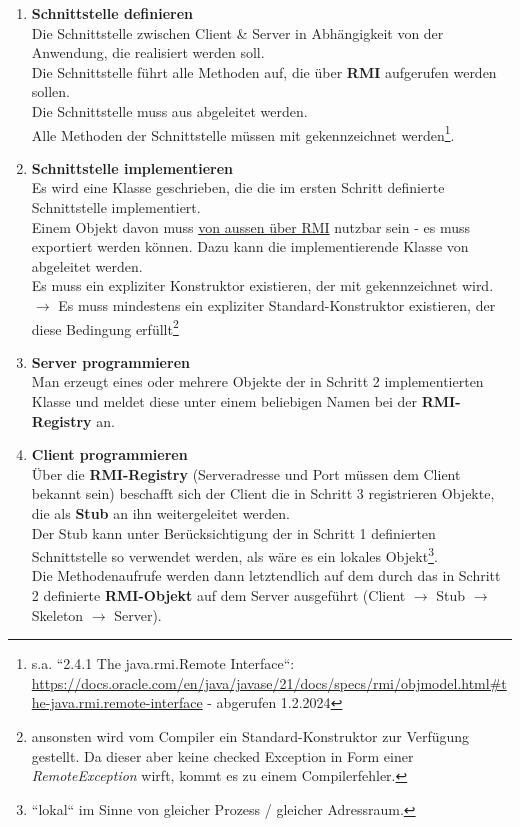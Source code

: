 \begin{enumerate}
    \item\label{itm:intdef} \textbf{Schnittstelle definieren}\\
    \noindent
    Die Schnittstelle zwischen Client \& Server in Abhängigkeit von der Anwendung, die realisiert werden soll.\\
    \noindent
    Die Schnittstelle führt alle Methoden auf, die über \textbf{RMI} aufgerufen werden sollen.\\
    \noindent
    Die Schnittstelle muss aus  abgeleitet werden.\\
    \noindent
    Alle Methoden der Schnittstelle müssen mit  gekennzeichnet werden\footnote{
    s.a. ``2.4.1 The java.rmi.Remote Interface``: \url{https://docs.oracle.com/en/java/javase/21/docs/specs/rmi/objmodel.html#the-java.rmi.remote-interface} - abgerufen 1.2.2024
    }.

    \item \textbf{Schnittstelle implementieren}\\
    \noindent
    Es wird eine Klasse geschrieben, die die im ersten Schritt definierte Schnittstelle implementiert.\\
    \noindent
    Einem Objekt davon muss \ul{von aussen über RMI} nutzbar sein - es muss exportiert werden können.
    Dazu kann die implementierende Klasse von  abgeleitet werden.\\
    Es muss ein expliziter Konstruktor existieren, der mit  gekennzeichnet wird. \\
    $\rightarrow$ Es muss mindestens ein expliziter Standard-Konstruktor existieren, der diese Bedingung erfüllt\footnote{
    ansonsten wird vom Compiler ein Standard-Konstruktor zur Verfügung gestellt.
    Da dieser aber keine checked Exception in Form einer \textit{RemoteException} wirft, kommt es zu einem Compilerfehler.
    }

    \item \textbf{Server programmieren}\\
    \noindent
    Man erzeugt eines oder mehrere Objekte der in Schritt 2 implementierten Klasse und meldet diese unter einem beliebigen Namen bei der \textbf{RMI-Registry} an.

    \item \textbf{Client programmieren}\\
    \noindent
    Über die \textbf{RMI-Registry} (Serveradresse und Port müssen dem Client bekannt sein) beschafft sich der Client die in Schritt 3 registrieren Objekte, die als \textbf{Stub} an ihn weitergeleitet werden.\\
    \noindent
    Der Stub kann unter Berücksichtigung der in Schritt 1 definierten Schnittstelle so verwendet werden, als wäre es ein lokales Objekt\footnote{
    ``lokal`` im Sinne von gleicher Prozess / gleicher Adressraum.
    }.\\
    \noindent
    Die Methodenaufrufe werden dann letztendlich auf dem durch das in Schritt 2 definierte \textbf{RMI-Objekt} auf dem Server ausgeführt (Client $\rightarrow$ Stub $\rightarrow$ Skeleton $\rightarrow$ Server).


\end{enumerate}
